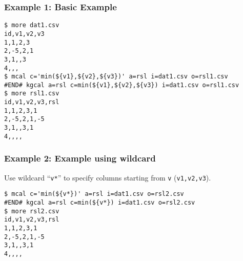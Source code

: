 \subsubsection*{Example 1: Basic Example}



\begin{Verbatim}[baselinestretch=0.7,frame=single]
$ more dat1.csv
id,v1,v2,v3
1,1,2,3
2,-5,2,1
3,1,,3
4,,,
$ mcal c='min(${v1},${v2},${v3})' a=rsl i=dat1.csv o=rsl1.csv
#END# kgcal a=rsl c=min(${v1},${v2},${v3}) i=dat1.csv o=rsl1.csv
$ more rsl1.csv
id,v1,v2,v3,rsl
1,1,2,3,1
2,-5,2,1,-5
3,1,,3,1
4,,,,
\end{Verbatim}
\subsubsection*{Example 2: Example using wildcard}

Use wildcard “\verb|v*|” to specify columns starting from \verb|v| (\verb|v1,v2,v3|).


\begin{Verbatim}[baselinestretch=0.7,frame=single]
$ mcal c='min(${v*})' a=rsl i=dat1.csv o=rsl2.csv
#END# kgcal a=rsl c=min(${v*}) i=dat1.csv o=rsl2.csv
$ more rsl2.csv
id,v1,v2,v3,rsl
1,1,2,3,1
2,-5,2,1,-5
3,1,,3,1
4,,,,
\end{Verbatim}
